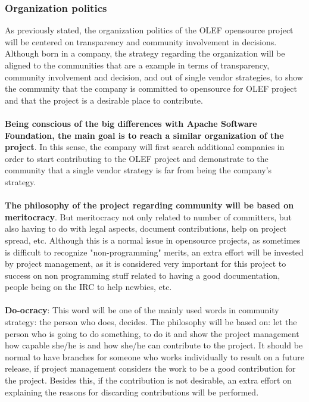 \documentclass[11pt]{article}
\begin{document}
\subsubsection{Organization politics}
As previously stated, the organization politics of the OLEF opensource project will be centered on transparency and community involvement in decisions. Although born in a company, the strategy regarding the organization will be aligned to the communities that are a example in terms of transparency, community involvement and decision, and out of single vendor strategies, to show the community that the company is committed to opensource for OLEF project and that the project is a desirable place to contribute.\\
\\
\textbf{Being conscious of the big differences with Apache Software Foundation, the main goal is to reach a similar organization of the project}. In this sense, the company will first search additional companies in order to start contributing to the OLEF project and demonstrate to the community that a single vendor strategy is far from being the company's strategy.\\
\\
\textbf{The philosophy of the project regarding community will be based on meritocracy}. But meritocracy not only related to number of committers, but also having to do with legal aspects, document contributions, help on project spread, etc. Although this is a normal issue in opensource projects, as sometimes is difficult to recognize "non-programming" merits, an extra effort will be invested by project management, as it is considered very important for this project to success on non programming stuff related to having a good documentation, people being on the IRC to help newbies, etc.\\
\\
\textbf{Do-ocracy}: This word will be one of the mainly used words in community strategy: the person who does, decides. The philosophy will be based on: let the person who is going to do something, to do it and show the project management how capable she/he is and how she/he can contribute to the project. It should be normal to have branches for someone who works individually to result on a future release, if project management considers the work to be a good contribution for the project. Besides this, if the contribution is not desirable, an extra effort on explaining the reasons for discarding contributions will be performed.\\
\end{document}
